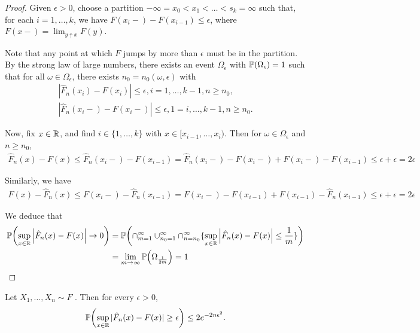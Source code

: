 \begin{proof}
  Given $\epsilon > 0$, choose a partition $-\infty = x_{0} < x_{1} <
  \dots < s_{k} = \infty$ such that, for each $i = 1, \dots, k$, we
  have $F(x_{i}-) - F(x_{i-1}) \leq \epsilon$, where $F(x-) = \lim_{y
    \uparrow x} F(y)$.

  Note that any point at which $F$ jumps by more than $\epsilon$ must
  be in the partition.  By the strong law of large numbers, there
  exists an event $\Omega_{\epsilon}$ with $\Prob{\Omega_{\epsilon}} =
  1$ such that for all $\omega \in \Omega_{\epsilon}$, there exists
  $n_{0} = n_{0}(\omega, \epsilon)$ with
  \begin{align}
    \label{eq:3}
    \left| \hat F_{n}(x_{i}) - F(x_{i}) \right| \leq \epsilon, i = 1,
    \dots, k - 1, n \geq n_{0}, \\
    \left| \hat F_{n}(x_{i}-) - F(x_{i}-) \right| \leq \epsilon, 1 =
    i, \dots, k-1, n \geq n_{0}.
  \end{align}

  Now, fix $x \in \mathbb{R}$, and find $i \in \{ 1, \dots, k \}$ with $x \in
  [x_{i-1}, \dots, x_{i})$.  Then for $\omega \in \Omega_{\epsilon}$
  and $n \geq n_{0}$,
  \begin{align}
    \label{eq:4}
    \hat F_{n}(x) - F(x) \leq \hat F_{n}(x_{i}-) - F(x_{i-1}) = \hat
    F_{n}(x_{i}-) - F(x_{i}-) + F(x_{i}-) - F(x_{i-1}) \leq \epsilon +
    \epsilon = 2\epsilon
  \end{align}

  Similarly, we have
  \begin{align}
    \label{eq:5}
    F(x) - \hat F_{n}(x) \leq F(x_{i}-) - \hat F_{n}(x_{i-1}) =
    F(x_{i}-) - F(x_{i-1}) + F(x_{i-1}) - \hat F_{n}(x_{i-1}) \leq
    \epsilon + \epsilon = 2 \epsilon
  \end{align}

  We deduce that
  \begin{align}
    \label{eq:6}
    \Prob{\sup_{x \in \R} \left| \hat F_{n}(x) - F(x) \right|
    \rightarrow 0} &= \Prob{\cap_{m=1}^{\infty} \cup_{n_{0} =
      1}^{\infty} \cap_{n=n_{0}}^{\infty} \{ \sup_{x \in \R} \left|
      \hat F_{n}(x) - F(x) \right| \leq \frac{1}{m} \}} \\
  &= \lim_{m \rightarrow \infty} \Prob{\Omega_{\frac{1}{2m}}} = 1
\end{align}

\end{proof}


\begin{thm}
  \label{defn:Introduction:1}
  Let $X_{1}, \dots, X_{n} \sim F$ \iid.  Then for every $\epsilon >
  0$,
  \begin{align}
    \label{eq:7}
    \Prob{\sup_{x \in \R}|\hat F_{n}(x) - F(x)| \geq \epsilon} \leq 2 e^{-2n\epsilon^{2}}.
  \end{align}
\end{thm}

